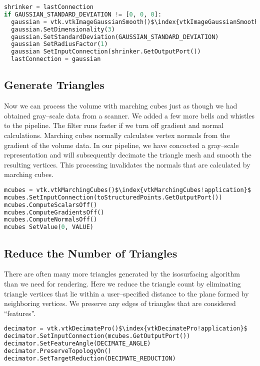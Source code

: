 \begin{lstlisting}[language=Python, caption={Smooth the Volume Data.}, escapechar=\$]
shrinker = lastConnection
if GAUSSIAN_STANDARD_DEVIATION != [0, 0, 0]:
  gaussian = vtk.vtkImageGaussianSmooth()$\index{vtkImageGaussianSmooth!application}$
  gaussian.SetDimensionality(3)
  gaussian.SetStandardDeviation(GAUSSIAN_STANDARD_DEVIATION)
  gaussian SetRadiusFactor(1)
  gaussian SetInputConnection(shrinker.GetOutputPort())
  lastConnection = gaussian
\end{lstlisting}

\subsection{Generate Triangles}

Now we can process the volume with marching cubes just as though we had obtained gray--scale data from a scanner. We added a few more bells and whistles to the pipeline. The filter runs faster if we turn off gradient and normal calculations. Marching cubes normally calculates vertex normals from the gradient of the volume data. In our pipeline, we have concocted a gray--scale representation and will subsequently decimate the triangle mesh and smooth the resulting vertices. This processing invalidates the normals that are calculated by marching cubes.

\begin{lstlisting}[language=Python, caption={Generate Triangles.}, escapechar=\$]
mcubes = vtk.vtkMarchingCubes()$\index{vtkMarchingCubes!application}$
mcubes.SetInputConnection(toStructuredPoints.GetOutputPort())
mcubes.ComputeScalarsOff()
mcubes.ComputeGradientsOff()
mcubes.ComputeNormalsOff()
mcubes SetValue(0, VALUE)
\end{lstlisting}

\subsection{Reduce the Number of Triangles}
There are often many more triangles generated by the isosurfacing algorithm than we need for rendering. Here we reduce the triangle count by eliminating triangle vertices that lie within a user--specified distance to the plane formed by neighboring vertices. We preserve any edges of triangles that are considered ``features''.

\begin{lstlisting}[language=Python, caption={Reduce the Number of Triangles.}, escapechar=\$]
decimator = vtk.vtkDecimatePro()$\index{vtkDecimatePro!application}$
decimator.SetInputConnection(mcubes.GetOutputPort())
decimator.SetFeatureAngle(DECIMATE_ANGLE)
decimator.PreserveTopologyOn()
decimator.SetTargetReduction(DECIMATE_REDUCTION)
\end{lstlisting}

